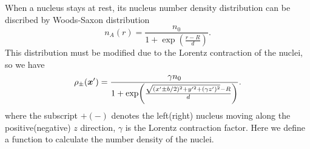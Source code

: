 \documentclass{cweb}
\begin{document}
\fi

When a nucleus stays at rest, its nucleus number density distribution can
be discribed by Woods-Saxon distribution
\begin{equation}
n_A(r) = \frac{n_0}{1 + \exp(\frac{r-R}{d})}.
\end{equation}
This distribution must be modified due to the Lorentz contraction of the
nuclei, so we have
\begin{equation}
\rho_\pm (\vb*{x}') = \frac{\gamma n_0}{1 + \exp(\frac{\sqrt{(x'\pm b/2)^2 +
y'^2 + (\gamma z')^2} - R}{d})}.
\end{equation}
where the subscript $+(-)$ denotes the left(right) nucleus moving along the
positive(negative) $z$ direction, $\gamma$ is the Lorentz contraction factor.
Here we define a function to calculate the number density of the nuclei.
\end{document}
